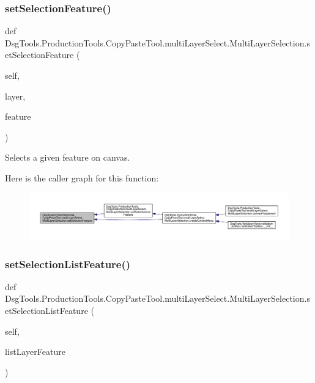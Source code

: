 \subsubsection{\texorpdfstring{set\+Selection\+Feature()}{setSelectionFeature()}}
{\footnotesize\ttfamily def Dsg\+Tools.\+Production\+Tools.\+Copy\+Paste\+Tool.\+multi\+Layer\+Select.\+Multi\+Layer\+Selection.\+set\+Selection\+Feature (\begin{DoxyParamCaption}\item[{}]{self,  }\item[{}]{layer,  }\item[{}]{feature }\end{DoxyParamCaption})}

\begin{DoxyVerb}Selects a given feature on canvas.
\end{DoxyVerb}
 Here is the caller graph for this function\+:
\nopagebreak
\begin{figure}[H]
\begin{center}
\leavevmode
\includegraphics[width=350pt]{class_dsg_tools_1_1_production_tools_1_1_copy_paste_tool_1_1multi_layer_select_1_1_multi_layer_selection_a5247c0f55a8d4225bf8db316331a4406_icgraph}
\end{center}
\end{figure}
\mbox{\label{class_dsg_tools_1_1_production_tools_1_1_copy_paste_tool_1_1multi_layer_select_1_1_multi_layer_selection_a98ef566da0b3d8a1ac39d63bde80dd3b}} 
\subsubsection{\texorpdfstring{set\+Selection\+List\+Feature()}{setSelectionListFeature()}}
{\footnotesize\ttfamily def Dsg\+Tools.\+Production\+Tools.\+Copy\+Paste\+Tool.\+multi\+Layer\+Select.\+Multi\+Layer\+Selection.\+set\+Selection\+List\+Feature (\begin{DoxyParamCaption}\item[{}]{self,  }\item[{}]{list\+Layer\+Feature }\end{DoxyParamCaption})}

